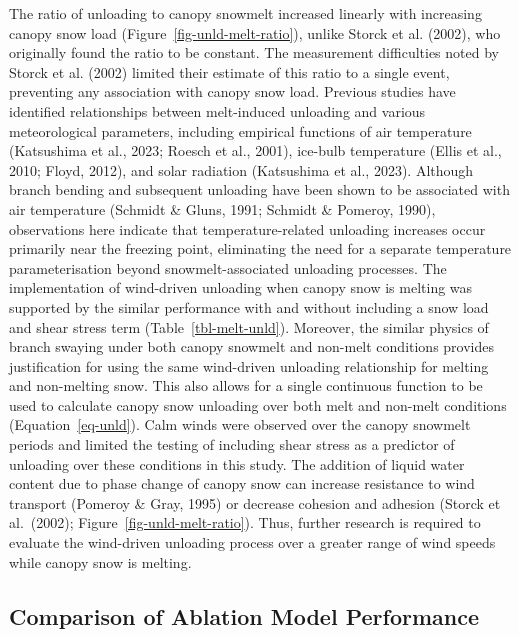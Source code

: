 \documentclass[
  letterpaper,
]{tex/uofsthesis-cs}
\begin{document}
The ratio of unloading to canopy snowmelt increased linearly with
increasing canopy snow load (Figure~\ref{fig-unld-melt-ratio}), unlike
Storck et al. (2002), who originally found the ratio to be constant. The
measurement difficulties noted by Storck et al. (2002) limited their
estimate of this ratio to a single event, preventing any association
with canopy snow load. Previous studies have identified relationships
between melt-induced unloading and various meteorological parameters,
including empirical functions of air temperature (Katsushima et al.,
2023; Roesch et al., 2001), ice-bulb temperature (Ellis et al., 2010;
Floyd, 2012), and solar radiation (Katsushima et al., 2023). Although
branch bending and subsequent unloading have been shown to be associated
with air temperature (Schmidt \& Gluns, 1991; Schmidt \& Pomeroy, 1990),
observations here indicate that temperature-related unloading increases
occur primarily near the freezing point, eliminating the need for a
separate temperature parameterisation beyond snowmelt-associated
unloading processes. The implementation of wind-driven unloading when
canopy snow is melting was supported by the similar performance with and
without including a snow load and shear stress term
(Table~\ref{tbl-melt-unld}). Moreover, the similar physics of branch
swaying under both canopy snowmelt and non-melt conditions provides
justification for using the same wind-driven unloading relationship for
melting and non-melting snow. This also allows for a single continuous
function to be used to calculate canopy snow unloading over both melt
and non-melt conditions (Equation~\ref{eq-unld}). Calm winds were
observed over the canopy snowmelt periods and limited the testing of
including shear stress as a predictor of unloading over these conditions
in this study. The addition of liquid water content due to phase change
of canopy snow can increase resistance to wind transport (Pomeroy \&
Gray, 1995) or decrease cohesion and adhesion (Storck et al.~(2002);
Figure~\ref{fig-unld-melt-ratio}). Thus, further research is required to
evaluate the wind-driven unloading process over a greater range of wind
speeds while canopy snow is melting.

\subsection{Comparison of Ablation Model
Performance}\label{comparison-of-ablation-model-performance}
\end{document}
